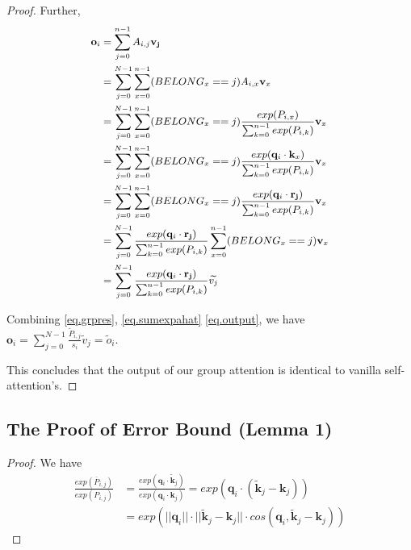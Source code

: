 \begin{sloppypar}
\begin{proof}
Further,
\begin{equation}
\label{eq.output}
\small
\begin{aligned}
\mathbf{o}_i&=\sum_{j=0}^{n-1} A_{i,j}\mathbf{v_j} \\
&=\sum_{j=0}^{N-1}\sum_{x=0}^{n-1} (BELONG_x==j)A_{i,x}\mathbf{v}_x \\
&=\sum_{j=0}^{N-1}\sum_{x=0}^{n-1}(BELONG_x==j)\frac{exp(P_{i,x})}{\sum_{k=0}^{n-1}exp(P_{i,k})}\mathbf{v}_x\\
&=\sum_{j=0}^{N-1}\sum_{x=0}^{n-1}(BELONG_x==j)\frac{exp(\mathbf{q}_i \cdot \mathbf{k}_x)}{\sum_{k=0}^{n-1}exp(P_{i,k})}\mathbf{v}_x\\
&=\sum_{j=0}^{N-1}\sum_{x=0}^{n-1}(BELONG_x==j)\frac{exp(\mathbf{q}_i \cdot \mathbf{r_j})}{\sum_{k=0}^{n-1}exp(P_{i,k})}\mathbf{v}_x\\
&=\sum_{j=0}^{N-1} \frac{exp(\mathbf{q}_i \cdot \mathbf{r_j})}{\sum_{k=0}^{n-1}exp(P_{i,k})} \sum_{x=0}^{n-1}(BELONG_x==j)\mathbf{v}_x\\
&=\sum_{j=0}^{N-1} \frac{exp(\mathbf{q}_i \cdot \mathbf{r_j})}{\sum_{k=0}^{n-1}exp(P_{i,k})} \widetilde{v_j}\\
\end{aligned}
\end{equation}

Combining \eqref{eq.grpres}, \eqref{eq.sumexpahat} \eqref{eq.output}, we have
$\mathit{\mathbf{o}_i=\sum_{j=0}^{N-1}\frac{\widetilde{P}_{i,j}}{s_i}\widetilde{v}_j=\widetilde{o}_i}$.

This concludes that the output of our group attention is identical to vanilla self-attention's.
\end{proof}


\subsection{The Proof of Error Bound (Lemma 1)}
\label{appendix.proof.errorBound}
\begin{proof}
\renewcommand{\qedsymbol}{}
We have
\begin{equation}
\begin{aligned}
    \frac{exp(\overline{P}_{i,j})}{exp(P_{i,j})}&=\frac{exp({\mathbf{q}}_i \cdot \widetilde{\mathbf{k}}_j)}{exp(\mathbf{q}_i \cdot \mathbf{k}_j)} = exp({\mathbf{q}}_i \cdot (\widetilde{ \mathbf{k}}_j-\mathbf{k}_j))\\
   &=exp(||\mathbf{q}_i|| \cdot ||\widetilde{\mathbf{k}}_j-\mathbf{k}_j||\cdot cos(\mathbf{q}_i,\widetilde{\mathbf{k}}_j-\mathbf{k}_j))
\end{aligned}
\end{equation}


\end{proof}
\end{sloppypar}
